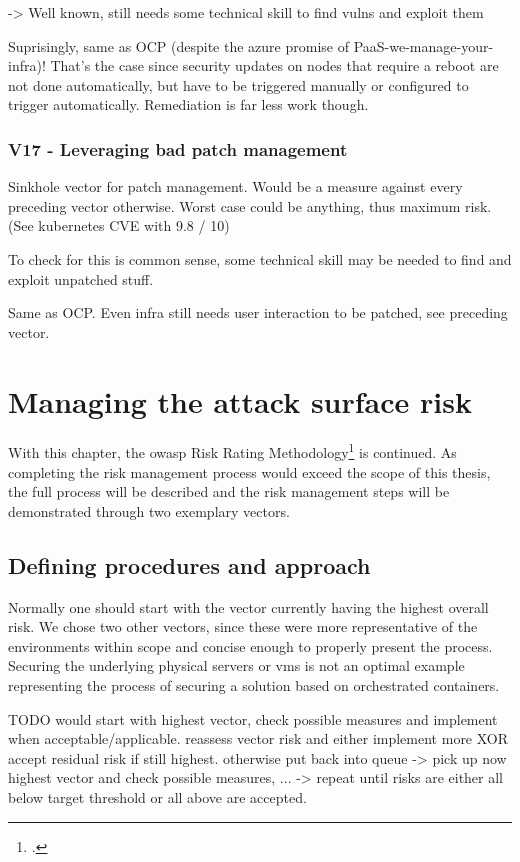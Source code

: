 -> Well known, still needs some technical skill to find vulns and exploit them

Suprisingly, same as OCP (despite the azure promise of PaaS-we-manage-your-infra)!
That’s the case since security updates on nodes that require a reboot are not done automatically, but have to be triggered manually or configured to trigger automatically.
Remediation is far less work though.

\subsection{V17 - Leveraging bad patch management}
Sinkhole vector for patch management. Would be a measure against every preceding vector otherwise.
Worst case could be anything, thus maximum risk. (See kubernetes CVE with 9.8 / 10)

To check for this is common sense, some technical skill may be needed to find and exploit unpatched stuff.

Same as OCP. Even infra still needs user interaction to be patched, see preceding vector.

\chapter{Managing the attack surface risk}

With this chapter, the \gls{owasp} Risk Rating Methodology\footcite{riskRating} is continued. As completing the risk management process would exceed the scope of this thesis, the full process will be described and the risk management steps will be demonstrated through two exemplary vectors.

\section{Defining procedures and approach}
Normally one should start with the vector currently having the highest overall risk. We chose two other vectors, since these were more representative of the environments within scope and concise enough to properly present the process. Securing the underlying physical servers or \gls{vm}s is not an optimal example representing the process of securing a solution based on orchestrated containers.

TODO would start with highest vector, check possible measures and implement when acceptable/applicable. reassess vector risk and either implement more XOR accept residual risk if still highest. otherwise put back into queue -> pick up now highest vector and check possible measures, ... -> repeat until risks are either all below target threshold or all above are accepted.

